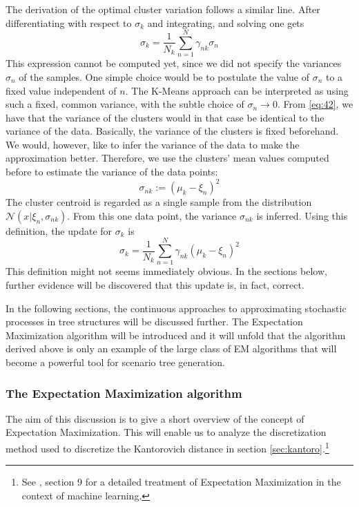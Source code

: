 The derivation of the optimal cluster variation follows a similar line.
After differentiating with respect to $\sigma_k$ and integrating, and solving one gets
\begin{equation}
  \label{eq:42}
  \sigma_k = \frac{1}{N_k}\sum_{n=1}^N \gamma_{nk}\sigma_n
\end{equation}
This expression cannot be computed yet, since we did not specify the variances $\sigma_n$ of the samples.
One simple choice would be to postulate the value of $\sigma_n$ to a fixed value independent of $n$.
The K-Means approach can be interpreted as using such a fixed, common variance, with the subtle choice of $\sigma_n\rightarrow 0$.
From \eqref{eq:42}, we have that the variance of the clusters would in that case be identical to the variance of the data.
Basically, the variance of the clusters is fixed beforehand.
We would, however, like to infer the variance of the data to make the approximation better.
Therefore, we use the clusters' mean values computed before to estimate the variance of the data points:
\begin{equation}
  \label{eq:43}
  \sigma_{nk} := (\mu_k-\xi_n)^2
\end{equation}
The cluster centroid is regarded as a single sample from the distribution $\mathcal{N}(x|\xi_n, \sigma_{nk})$.
From this one data point, the variance $\sigma_{nk}$ is inferred.
Using this definition, the update for $\sigma_k$ is
\begin{equation}
  \label{eq:44}
  \sigma_k = \frac{1}{N_k}\sum_{n=1}^N \gamma_{nk}(\mu_k-\xi_n)^2
\end{equation}
This definition might not seems immediately obvious.
In the sections below, further evidence will be discovered that this update is, in fact, correct.
%

In the following sections, the continuous approaches to approximating stochastic processes in tree structures will be discussed further.
The Expectation Maximization algorithm will be introduced and it will unfold that the algorithm derived above is only an example of the large class of EM algorithms that will become a powerful tool for scenario tree generation.
\subsubsection{The Expectation Maximization algorithm}
The aim of this discussion is to give a short overview of the concept of Expectation Maximization.
This will enable us to analyze the discretization method used to discretize the Kantorovich distance in section \ref{sec:kantoro}.\footnote{See \cite{Bishop2006}, section 9 for a detailed treatment of Expectation Maximization in the context of machine learning.}

